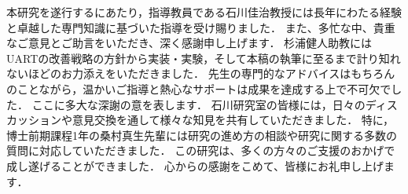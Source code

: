
\acknowledgement

本研究を遂行するにあたり，指導教員である石川佳治教授には長年にわたる経験と卓越した専門知識に基づいた指導を受け賜りました．
また、多忙な中、貴重なご意見とご助言をいただき、深く感謝申し上げます．
杉浦健人助教にはUARTの改善戦略の方針から実装・実験，そして本稿の執筆に至るまで計り知れないほどのお力添えをいただきました．
先生の専門的なアドバイスはもちろんのことながら，温かいご指導と熱心なサポートは成果を達成する上で不可欠でした．
ここに多大な深謝の意を表します．
石川研究室の皆様には，日々のディスカッションや意見交換を通して様々な知見を共有していただきました．
特に，博士前期課程1年の桑村真生先輩には研究の進め方の相談や研究に関する多数の質問に対応していただきました．
この研究は、多くの方々のご支援のおかげで成し遂げることができました．
心からの感謝をこめて、皆様にお礼申し上げます．
